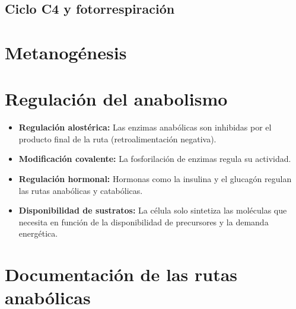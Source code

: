 \subsection{Ciclo C4 y fotorrespiración}

\section{Metanogénesis}


\section{Regulación del anabolismo}

\begin{itemize}
    \item \textbf{Regulación alostérica:} Las enzimas anabólicas son inhibidas por el producto final de la ruta (retroalimentación negativa).
    \item \textbf{Modificación covalente:} La fosforilación de enzimas regula su actividad.
    \item \textbf{Regulación hormonal:} Hormonas como la insulina y el glucagón regulan las rutas anabólicas y catabólicas.
    \item \textbf{Disponibilidad de sustratos:} La célula solo sintetiza las moléculas que necesita en función de la disponibilidad de precursores y la demanda energética.
\end{itemize}

\section{Documentación de las rutas anabólicas}

